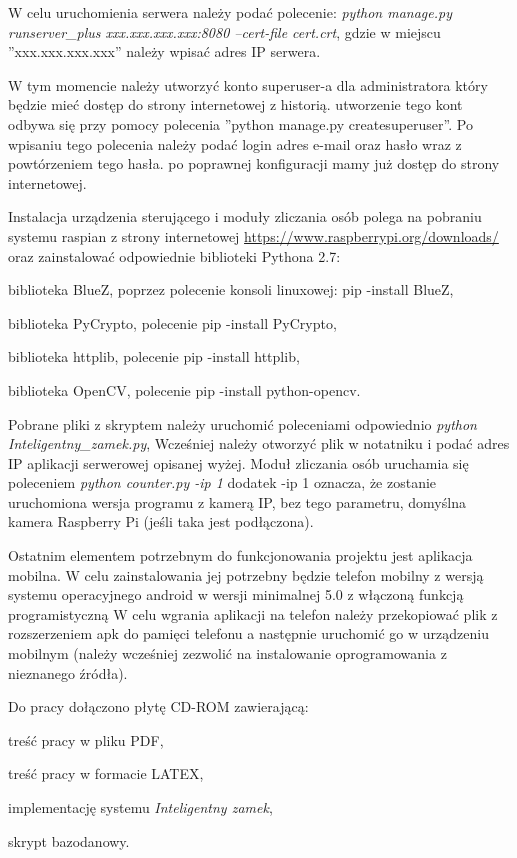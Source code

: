 \documentclass[twoside,10pt]{article}
\def\NazwaSys {\textit{Inteligentny zamek}}
\begin{document}
W celu uruchomienia serwera należy podać polecenie:\newline
\textit{python manage.py runserver\_plus xxx.xxx.xxx.xxx:8080 --cert-file cert.crt}, \newline
gdzie w miejscu ''xxx.xxx.xxx.xxx'' należy wpisać adres IP serwera.

W tym momencie należy utworzyć konto superuser-a dla administratora który będzie mieć dostęp do strony internetowej z historią. utworzenie tego kont odbywa się przy pomocy polecenia ''python manage.py createsuperuser''. Po wpisaniu tego polecenia należy podać login adres e-mail oraz hasło wraz z powtórzeniem tego hasła. po poprawnej konfiguracji mamy już dostęp do strony internetowej.

Instalacja urządzenia sterującego i moduły zliczania osób polega na pobraniu systemu raspian z strony internetowej \href{https://www.raspberrypi.org/downloads/}{https://www.raspberrypi.org/downloads/} oraz zainstalować odpowiednie biblioteki Pythona 2.7:
\begin{itemize*}
\item biblioteka BlueZ, poprzez polecenie konsoli linuxowej: pip -install BlueZ,
\item biblioteka PyCrypto, polecenie pip -install PyCrypto,
\item biblioteka httplib, polecenie pip -install httplib,
\item biblioteka OpenCV, polecenie pip -install python-opencv.
\end{itemize*}

Pobrane pliki z skryptem należy uruchomić poleceniami odpowiednio \textit{python Inteligentny\_zamek.py}, Wcześniej należy otworzyć plik w notatniku i podać adres IP aplikacji serwerowej opisanej wyżej. Moduł zliczania osób uruchamia się poleceniem \textit{python counter.py -ip 1} dodatek -ip 1 oznacza, że zostanie uruchomiona wersja programu z kamerą IP, bez tego parametru, domyślna kamera Raspberry Pi (jeśli taka jest podłączona).

Ostatnim elementem potrzebnym do funkcjonowania projektu jest aplikacja mobilna. W celu zainstalowania jej potrzebny będzie telefon mobilny z wersją systemu operacyjnego android w wersji minimalnej 5.0 z włączoną funkcją programistyczną  W celu wgrania aplikacji na telefon należy przekopiować plik z rozszerzeniem apk do pamięci telefonu a następnie uruchomić go w urządzeniu mobilnym (należy wcześniej zezwolić na instalowanie oprogramowania z nieznanego źródła).

\newline
Do pracy dołączono płytę CD-ROM zawierającą:
\begin{itemize*}
\item treść pracy w pliku PDF,
\item treść pracy w formacie LATEX,
\item implementację systemu \textsl{\NazwaSys},
\item skrypt bazodanowy.
\end{itemize*} 
\end{document}
